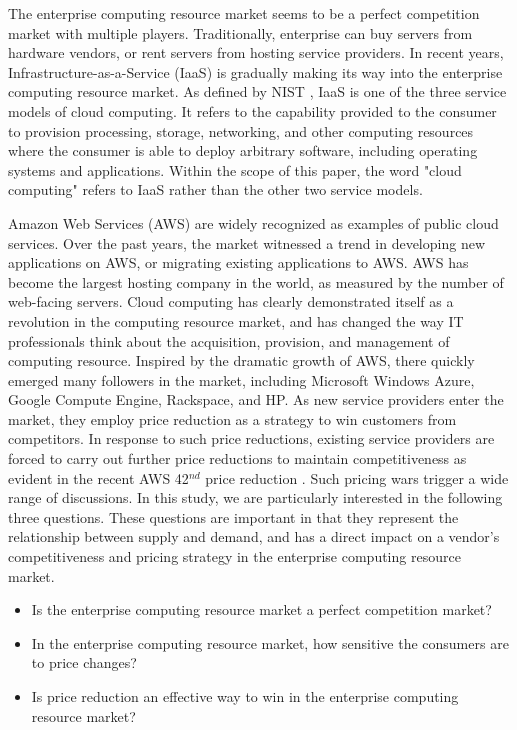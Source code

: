 \documentclass[10pt,journal,cspaper,compsoc]{IEEEtran}
\begin{document}
The enterprise computing resource market seems to be a perfect competition market with multiple players. Traditionally, enterprise can buy servers from hardware vendors, or rent servers from hosting service providers. In recent years, Infrastructure-as-a-Service (IaaS) is gradually making its way into the enterprise computing resource market. As defined by NIST \cite{nist}, IaaS is one of the three service models of cloud computing. It refers to the capability provided to the consumer to provision processing, storage, networking, and other computing resources where the consumer is able to deploy arbitrary software, including operating systems and applications. Within the scope of this paper, the word "cloud computing" refers to IaaS rather than the other two service models. 

Amazon Web Services (AWS) are widely recognized as examples of public cloud services. Over the past years, the market witnessed a trend in developing new applications on AWS, or migrating existing applications to AWS. AWS has become the largest hosting company in the world, as measured by the number of web-facing servers. Cloud computing has clearly demonstrated itself as a revolution in the computing resource market, and has changed the way IT professionals think about the acquisition, provision, and management of computing resource. Inspired by the dramatic growth of AWS, there quickly emerged many followers in the market, including Microsoft Windows Azure, Google Compute Engine, Rackspace, and HP. As new service providers enter the market, they employ price reduction as a strategy to win customers from competitors. In response to such price reductions, existing service providers are forced to carry out further price reductions to maintain competitiveness as evident in the recent AWS 42$^{nd}$ price reduction \cite{web:aws42pricereduction}. Such pricing wars trigger a wide range of discussions. In this study, we are particularly interested in the following three questions. These questions are important in that they represent the relationship between supply and demand, and has a direct impact on a vendor's competitiveness and pricing strategy in the enterprise computing resource market.

\begin{itemize}
	\item Is the enterprise computing resource market a perfect competition market? 
	\item In the enterprise computing resource market, how sensitive the consumers are to price changes?
	\item Is price reduction an effective way to win in the enterprise computing resource market?
\end{itemize}
\end{document}
